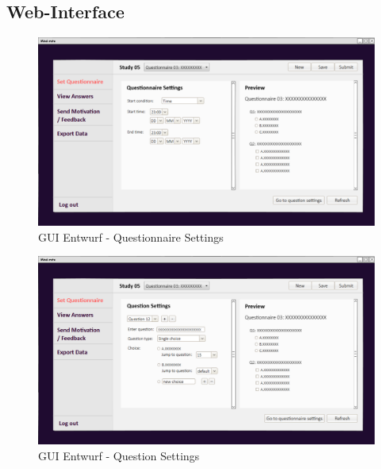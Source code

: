 \documentclass[a4paper]{scrreprt}
\begin{document}
            \subsection{\gls{Web-Interface}}
                \vspace*{1.5cm}
                \begin{figure}[ht]
                    \centering
                    \includegraphics[scale = 0.25]{web_set1.png}
                    \caption{GUI Entwurf - Questionnaire Settings}
                \end{figure}

                \begin{figure}[ht]
                    \centering
                    \includegraphics[scale = 0.25]{web_set2.png}
                    \caption{GUI Entwurf - Question Settings}
                \end{figure}
\end{document}
